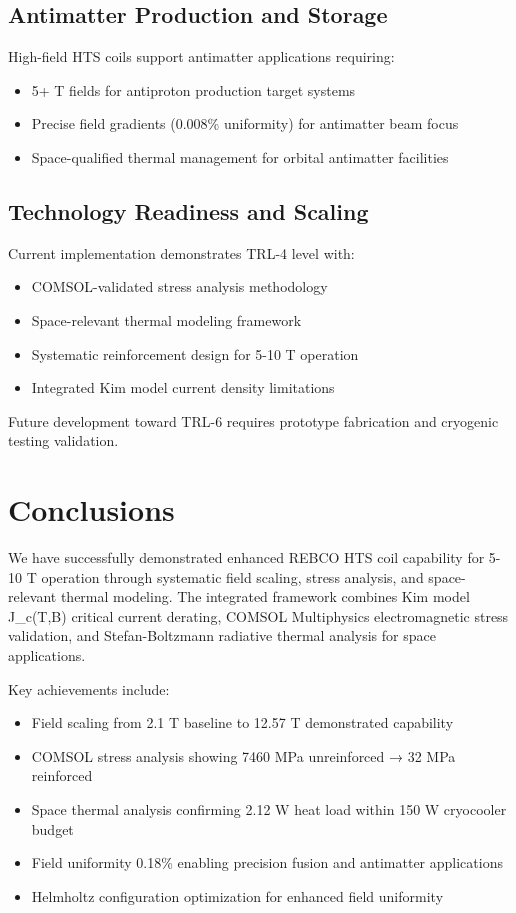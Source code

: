 \subsection{Antimatter Production and Storage}

High-field HTS coils support antimatter applications requiring:
\begin{itemize}
\item 5+ T fields for antiproton production target systems
\item Precise field gradients (0.008\% uniformity) for antimatter beam focus
\item Space-qualified thermal management for orbital antimatter facilities
\end{itemize}

\subsection{Technology Readiness and Scaling}

Current implementation demonstrates TRL-4 level with:
\begin{itemize}
\item COMSOL-validated stress analysis methodology
\item Space-relevant thermal modeling framework  
\item Systematic reinforcement design for 5-10 T operation
\item Integrated Kim model current density limitations
\end{itemize}

Future development toward TRL-6 requires prototype fabrication and cryogenic testing validation.

\section{Conclusions}

We have successfully demonstrated enhanced REBCO HTS coil capability for 5-10 T operation through systematic field scaling, stress analysis, and space-relevant thermal modeling. The integrated framework combines Kim model J_c(T,B) critical current derating, COMSOL Multiphysics electromagnetic stress validation, and Stefan-Boltzmann radiative thermal analysis for space applications.

Key achievements include:
\begin{itemize}
\item Field scaling from 2.1 T baseline to 12.57 T demonstrated capability
\item COMSOL stress analysis showing 7460 MPa unreinforced → 32 MPa reinforced
\item Space thermal analysis confirming 2.12 W heat load within 150 W cryocooler budget
\item Field uniformity 0.18\% enabling precision fusion and antimatter applications  
\item Helmholtz configuration optimization for enhanced field uniformity
\end{itemize}

